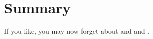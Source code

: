 \section*{Summary}

\begin{note}
  If you like, you may now forget about \qWhy{} and \qHow{} and \issueInclusion{}.
\end{note}










